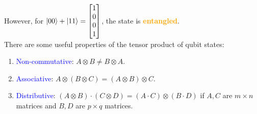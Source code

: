 \documentclass{book}
\begin{document}
However, for $\ket{00} + \ket{11} = \begin{bmatrix} 1 \\ 0 \\ 0 \\ 1 \end{bmatrix}$, the state is \textcolor{orange}{\textbf{entangled}}.\\
\newpage
There are some useful properties of the tensor product of qubit states:
\begin{enumerate}
    \item \textcolor{blue}{Non-commutative}: $A \otimes B \neq B \otimes A$.
    \item \textcolor{blue}{Associative}: $A \otimes (B \otimes C) = (A \otimes B) \otimes C$.
    \item \textcolor{blue}{Distributive}: $(A \otimes B) \cdot (C \otimes D) = (A \cdot C) \otimes (B \cdot D)$ if $A, C$ are $m \times n$ matrices and $B, D$ are $p \times q$ matrices.
\end{enumerate}
\end{document}
